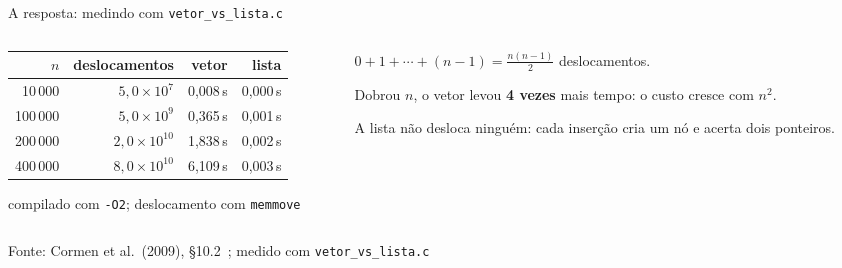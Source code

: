 \documentclass[aspectratio=169]{beamer}
\newcommand{\fonte}[1]{\vfill\hfill{\scriptsize\textcolor{UFSGray}{Fonte: #1}}}
\begin{document}
\begin{frame}{A resposta: medindo com \texttt{vetor\_vs\_lista.c}}
  \begin{columns}[c]
    \begin{column}{0.56\textwidth}
      \begin{center}
      \small
      \begin{tabular}{@{}rrrr@{}}
        \toprule
        $n$ & deslocamentos & vetor & lista\\
        \midrule
        10\,000  & $5{,}0 \times 10^{7}$  & 0,008\,s & 0,000\,s\\
        100\,000 & $5{,}0 \times 10^{9}$  & 0,365\,s & 0,001\,s\\
        200\,000 & $2{,}0 \times 10^{10}$ & 1,838\,s & 0,002\,s\\
        400\,000 & $8{,}0 \times 10^{10}$ & 6,109\,s & 0,003\,s\\
        \bottomrule
      \end{tabular}

      \medskip
      \scriptsize compilado com \texttt{-O2}; deslocamento com \texttt{memmove}
      \end{center}
    \end{column}
    \begin{column}{0.4\textwidth}
      \small
      $0 + 1 + \cdots + (n-1) = \frac{n(n-1)}{2}$ deslocamentos.

      \medskip
      Dobrou $n$, o vetor levou \textbf{4 vezes} mais tempo: o custo
      cresce com $n^2$.

      \medskip
      A lista não desloca ninguém: cada inserção cria um nó e acerta
      dois ponteiros.
    \end{column}
  \end{columns}
  \fonte{Cormen et al.\ (2009), §10.2~\cite{cormen2009introduction};
    medido com \texttt{vetor\_vs\_lista.c}}
\end{frame}
\end{document}
